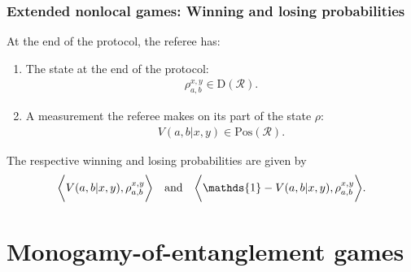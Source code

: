 \documentclass{beamer}
\def\I{\mathds{1}}
\newcommand{\biggip}[2]{\biggl\langle #1, #2 \biggr\rangle}
\def\R{\mathcal{R}}
\newcommand{\setft}[1]{\mathrm{#1}}
\newcommand{\Density}{\setft{D}}
\newcommand{\Pos}{\setft{Pos}}
\begin{document}
\begin{frame}
	\frametitle{Extended nonlocal games: Winning and losing probabilities}
	At the end of the protocol, the referee has: 
		\begin{enumerate}
			\item The state at the end of the protocol: 
				\begin{align*}
					\rho_{a,b}^{x,y} \in \Density(\R).
				\end{align*}
			\item A measurement the referee makes on its part of the state $\rho$: 
			\begin{align*}
				V(a,b|x,y) \in \Pos(\R).
			\end{align*}				
		\end{enumerate}
	The respective winning and losing probabilities are given by
		\begin{align*}
			\biggip{V(a,b|x,y)}{\rho_{a,b}^{x,y}} \quad \textnormal{and} \quad \biggip{\I - V(a,b|x,y)}{\rho_{a,b}^{x,y}}. 
		\end{align*}

\end{frame}

  \section{Monogamy-of-entanglement games}
\end{document}

